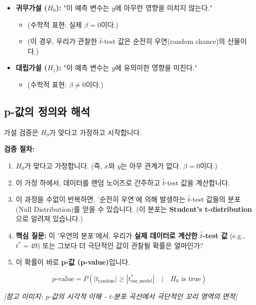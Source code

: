 \documentclass[11pt,a4paper]{book}
\theoremstyle{definition}
\begin{document}
\begin{itemize}
    \item \textbf{귀무가설 ($H_0$):} "이 예측 변수는 $y$에 아무런 영향을 미치지 않는다."
        \begin{itemize}
            \item (수학적 표현: 실제 $\beta = 0$이다.)
            \item (이 경우, 우리가 관찰한 $\hat{t}$-test 값은 순전히 우연(random chance)의 산물이다.)
        \end{itemize}
    
    \item \textbf{대립가설 ($H_1$):} "이 예측 변수는 $y$에 유의미한 영향을 미친다."
        \begin{itemize}
            \item (수학적 표현: $\beta \neq 0$이다.)
        \end{itemize}
\end{itemize}

\subsection{p-값의 정의와 해석}

가설 검증은 $H_0$가 맞다고 가정하고 시작합니다.

\textbf{검증 절차:}
\begin{enumerate}
    \item $H_0$가 맞다고 가정합니다. (즉, $x$와 $y$는 아무 관계가 없다. $\beta=0$이다.)
    \item 이 가정 하에서, 데이터를 랜덤 노이즈로 간주하고 $\hat{t}$-test 값을 계산합니다.
    \item 이 과정을 수없이 반복하면, '순전히 우연'에 의해 발생하는 $\hat{t}$-test 값들의 분포(Null Distribution)를 얻을 수 있습니다. (이 분포는 \textbf{Student's t-distribution}으로 알려져 있습니다.)
    \item \textbf{핵심 질문:} 이 '우연의 분포'에서, 우리가 \textbf{실제 데이터로 계산한 $\hat{t}$-test 값} (e.g., $t^* = 49$) 또는 그보다 더 극단적인 값이 관찰될 확률은 얼마인가?
    \item 이 확률이 바로 \textbf{p-값 (p-value)}입니다.
\end{enumerate}

\[
    p\text{-value} = P(|t_{\text{random}}| \ge |t^{*}_{\text{our\_model}}| \quad | \quad H_0 \text{ is true})
\]

\textit{[참고 이미지: p-값의 시각적 이해 - t-분포 곡선에서 극단적인 꼬리 영역의 면적]}
\end{document}
